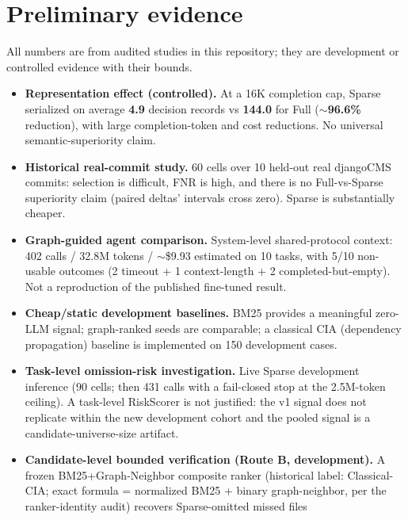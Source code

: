 \documentclass[11pt,a4paper]{article}
\begin{document}
\section{Preliminary evidence}
\label{sec:prelim}

All numbers are from audited studies in this repository; they are development
or controlled evidence with their bounds.

\begin{itemize}
  \item \textbf{Representation effect (controlled).} At a 16K completion cap,
        Sparse serialized on average \textbf{4.9} decision records vs
        \textbf{144.0} for Full ($\sim$\textbf{96.6\%} reduction), with large
        completion-token and cost reductions. No universal semantic-superiority
        claim.
  \item \textbf{Historical real-commit study.} 60 cells over 10 held-out real
        djangoCMS commits: selection is difficult, FNR is high, and there is no
        Full-vs-Sparse superiority claim (paired deltas' intervals cross zero).
        Sparse is substantially cheaper.
  \item \textbf{Graph-guided agent comparison.} System-level shared-protocol
        context: 402 calls / 32.8M tokens / $\sim$\$9.93 estimated on 10 tasks,
        with 5/10 non-usable outcomes (2 timeout + 1 context-length + 2
        completed-but-empty). Not a reproduction of the published fine-tuned
        result.
  \item \textbf{Cheap/static development baselines.} BM25 provides a meaningful
        zero-LLM signal; graph-ranked seeds are comparable; a classical CIA
        (dependency propagation) baseline is implemented on 150 development
        cases.
  \item \textbf{Task-level omission-risk investigation.} Live Sparse
        development inference (90 cells; then 431 calls with a fail-closed stop
        at the 2.5M-token ceiling). A task-level RiskScorer is not justified:
        the v1 signal does not replicate within the new development cohort and
        the pooled signal is a candidate-universe-size artifact.
  \item \textbf{Candidate-level bounded verification (Route B, development).}
        A frozen BM25+Graph-Neighbor composite ranker (historical label:
        Classical-CIA; exact formula = normalized BM25 + binary graph-neighbor,
        per the ranker-identity audit) recovers Sparse-omitted missed files

\end{itemize}
\end{document}
